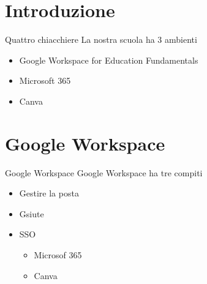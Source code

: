 \section{Introduzione}
\begin{frame}{Quattro chiacchiere}
	La nostra scuola ha 3 ambienti 
	\begin{itemize}[(I)]
		\item<1-> Google Workspace for Education Fundamentals
		\item<2-> Microsoft 365
		\item<3-> Canva
	\end{itemize}
\end{frame}
\section{Google Workspace}
\begin{frame}{Google Workspace}
	Google Workspace ha tre compiti
	\begin{itemize}[(I)]
		\item<1-> Gestire la posta
		\item<2-> Gsiute 
		\item<3-> SSO
		\begin{itemize}
			\item<4->Microsof 365
			\item<5->Canva
		\end{itemize}
	\end{itemize}
\end{frame}